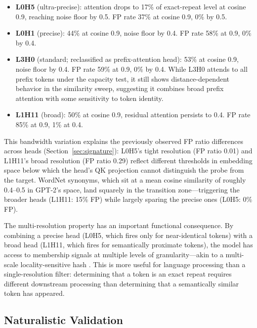 \documentclass[11pt]{article}
\begin{document}
\begin{itemize}
    \item \textbf{L0H5} (ultra-precise): attention drops to 17\% of exact-repeat level at cosine 0.9, reaching noise floor by 0.5. FP rate 37\% at cosine 0.9, 0\% by 0.5.
    \item \textbf{L0H1} (precise): 44\% at cosine 0.9, noise floor by 0.4. FP rate 58\% at 0.9, 0\% by 0.4.
    \item \textbf{L3H0} (standard; reclassified as prefix-attention head): 53\% at cosine 0.9, noise floor by 0.4. FP rate 59\% at 0.9, 0\% by 0.4. While L3H0 attends to all prefix tokens under the capacity test, it still shows distance-dependent behavior in the similarity sweep, suggesting it combines broad prefix attention with some sensitivity to token identity.
    \item \textbf{L1H11} (broad): 50\% at cosine 0.9, residual attention persists to 0.4. FP rate 85\% at 0.9, 1\% at 0.4.
\end{itemize}

This bandwidth variation explains the previously observed FP ratio differences across heads (Section~\ref{sec:signature}): L0H5's tight resolution (FP ratio 0.01) and L1H11's broad resolution (FP ratio 0.29) reflect different thresholds in embedding space below which the head's QK projection cannot distinguish the probe from the target. WordNet synonyms, which sit at a mean cosine similarity of roughly 0.4--0.5 in GPT-2's space, land squarely in the transition zone---triggering the broader heads (L1H11: 15\% FP) while largely sparing the precise ones (L0H5: 0\% FP).

The multi-resolution property has an important functional consequence. By combining a precise head (L0H5, which fires only for near-identical tokens) with a broad head (L1H11, which fires for semantically proximate tokens), the model has access to membership signals at multiple levels of granularity---akin to a multi-scale locality-sensitive hash \citep{dong2019learning}. This is more useful for language processing than a single-resolution filter: determining that a token is an exact repeat requires different downstream processing than determining that a semantically similar token has appeared.

\subsection{Naturalistic Validation}
\label{sec:naturalistic}
\end{document}
